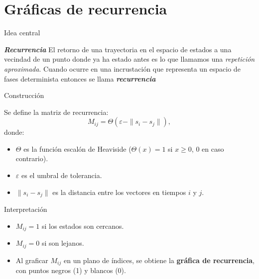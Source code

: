 \documentclass[11pt]{beamer}
\begin{document}
\section{Gráficas de recurrencia}
\begin{frame} 
\tableofcontents[currentsection] %
\end{frame}

\begin{frame}{Idea central}
	\begin{block}{\textit{\textbf{Recurrencia}}}
		 El retorno de una trayectoria en el espacio de estados a una vecindad de un punto donde ya ha estado antes es lo que llamamos una \textit{repetición aproximada}. Cuando ocurre en una incrustación que representa un espacio de fases determinista entonces se llama \textit{\textbf{recurrencia}}
	\end{block}
	
	
\end{frame}

\begin{frame}{Construcción}
	\begin{block}{}
        Se define la matriz de recurrencia:
        \[
            M_{ij} = \Theta(\varepsilon - \| s_i - s_j \|),
        \]
        donde:
        \begin{itemize}
            \item $\Theta$ es la función escalón de Heaviside 
                  ($\Theta(x) = 1$ si $x \geq 0$, $0$ en caso contrario).
            \item $\varepsilon$ es el umbral de tolerancia.
            \item $\| s_i - s_j \|$ es la distancia entre los vectores en tiempos $i$ y $j$.
        \end{itemize}
    \end{block}
\end{frame}
    
\begin{frame}{Interpretación}
	\begin{block}{}
        \begin{itemize}
            \item $M_{ij} = 1$ si los estados son cercanos.
            \item $M_{ij} = 0$ si son lejanos.
            \item Al graficar $M_{ij}$ en un plano de índices, se obtiene la 
                  \textbf{gráfica de recurrencia}, con puntos negros (1) y blancos (0).
        \end{itemize}
    \end{block}
\end{frame}
\end{document}
